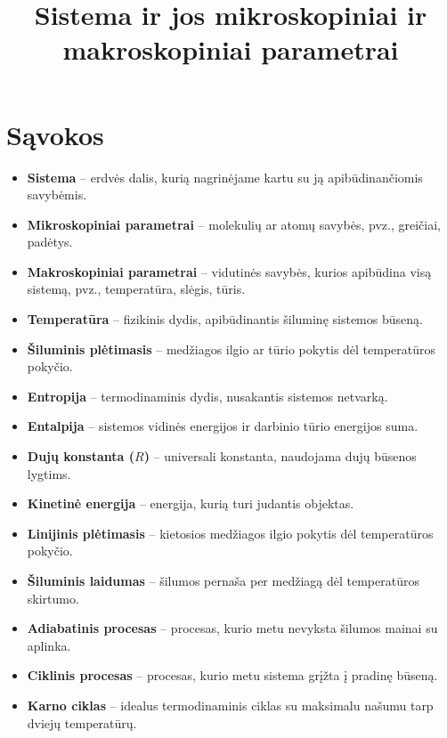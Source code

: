 \documentclass[a4paper,12pt]{article}
\begin{document}
\title{Sistema ir jos mikroskopiniai ir makroskopiniai parametrai}
\author{}
\date{}
\maketitle

\tableofcontents

\section{Sąvokos}

\begin{itemize}
    \item \textbf{Sistema} – erdvės dalis, kurią nagrinėjame kartu su ją apibūdinančiomis savybėmis.
    \item \textbf{Mikroskopiniai parametrai} – molekulių ar atomų savybės, pvz., greičiai, padėtys.
    \item \textbf{Makroskopiniai parametrai} – vidutinės savybės, kurios apibūdina visą sistemą, pvz., temperatūra, slėgis, tūris.
    \item \textbf{Temperatūra} – fizikinis dydis, apibūdinantis šiluminę sistemos būseną.
    \item \textbf{Šiluminis plėtimasis} – medžiagos ilgio ar tūrio pokytis dėl temperatūros pokyčio.
    \item \textbf{Entropija} – termodinaminis dydis, nusakantis sistemos netvarką.
    \item \textbf{Entalpija} – sistemos vidinės energijos ir darbinio tūrio energijos suma.
    \item \textbf{Dujų konstanta ($R$)} – universali konstanta, naudojama dujų būsenos lygtims.
    \item \textbf{Kinetinė energija} – energija, kurią turi judantis objektas.
    \item \textbf{Linijinis plėtimasis} – kietosios medžiagos ilgio pokytis dėl temperatūros pokyčio.
    \item \textbf{Šiluminis laidumas} – šilumos pernaša per medžiagą dėl temperatūros skirtumo.
    \item \textbf{Adiabatinis procesas} – procesas, kurio metu nevyksta šilumos mainai su aplinka.
    \item \textbf{Ciklinis procesas} – procesas, kurio metu sistema grįžta į pradinę būseną.
    \item \textbf{Karno ciklas} – idealus termodinaminis ciklas su maksimalu našumu tarp dviejų temperatūrų.
\end{itemize}
\end{document}
